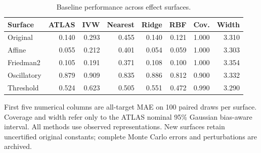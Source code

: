 \begin{table}[htbp]
\centering\small
\setlength{\tabcolsep}{4pt}
\caption{Baseline performance across effect surfaces.}
\label{tab:b-surfaces}
\begin{tabular}{lrrrrrrr}
\toprule
Surface & ATLAS & IVW & Nearest & Ridge & RBF & Cov. & Width \\
\midrule
Original & 0.140 & 0.293 & 0.455 & 0.140 & 0.121 & 1.000 & 3.310 \\
Affine & 0.055 & 0.212 & 0.401 & 0.054 & 0.059 & 1.000 & 3.303 \\
Friedman2 & 0.105 & 0.191 & 0.371 & 0.108 & 0.100 & 1.000 & 3.354 \\
Oscillatory & 0.879 & 0.909 & 0.835 & 0.886 & 0.812 & 0.900 & 3.332 \\
Threshold & 0.524 & 0.623 & 0.505 & 0.551 & 0.472 & 0.990 & 3.290 \\
\bottomrule
\end{tabular}
\par\smallskip\begin{minipage}{0.97\linewidth}\footnotesize First five numerical columns are all-target MAE on 100 paired draws per surface. Coverage and width refer only to the ATLAS nominal 95\% Gaussian bias-aware interval. All methods use observed representations. New surfaces retain uncertified original constants; complete Monte Carlo errors and perturbations are archived.\end{minipage}
\end{table}
